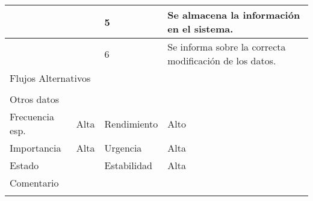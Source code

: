 \documentclass{article}
\begin{document}
\begin{table}[h]
\begin{tabular}{|l|l|l|l|l|l|}
\hline
\multicolumn{1}{|p{1cm}|}{} & \multicolumn{2}{p{3cm}}{} & \multicolumn{1}{|p{1cm}|}{5} & \multicolumn{2}{p{3cm}|}{Se almacena la información en el sistema.}\\
\hline
\multicolumn{1}{|p{1cm}|}{} & \multicolumn{2}{p{3cm}}{} & \multicolumn{1}{|p{1cm}|}{6} & \multicolumn{2}{p{3cm}|}{Se informa sobre la correcta modificación de los datos.}\\
\hline
\multicolumn{6}{|p{10cm}|}{Flujos Alternativos}\\
\hline
\multicolumn{1}{|p{1cm}}{} & \multicolumn{5}{|p{9cm}|}{}\\
\hline
\multicolumn{6}{|p{10cm}|}{Otros datos}\\
\hline
\multicolumn{1}{|p{2cm}|}{Frecuencia esp.} & \multicolumn{2}{p{3cm}}{Alta} & \multicolumn{1}{|p{2cm}|}{Rendimiento} & \multicolumn{2}{p{3cm}|}{Alto}\\
\hline
\multicolumn{1}{|p{2cm}|}{Importancia} & \multicolumn{2}{p{3cm}}{Alta} & \multicolumn{1}{|p{2cm}|}{Urgencia} & \multicolumn{2}{p{3cm}|}{Alta}\\
\hline
\multicolumn{1}{|p{2cm}|}{Estado} & \multicolumn{2}{p{3cm}}{} & \multicolumn{1}{|p{2cm}|}{Estabilidad} & \multicolumn{2}{p{3cm}|}{Alta}\\
\hline
\multicolumn{6}{|p{10cm}|}{Comentario}\\
\hline
\multicolumn{6}{|p{10cm}|}{}\\
\hline
\end{tabular}
\end{table}
\addtocounter{ni}{1}
\end{document}
